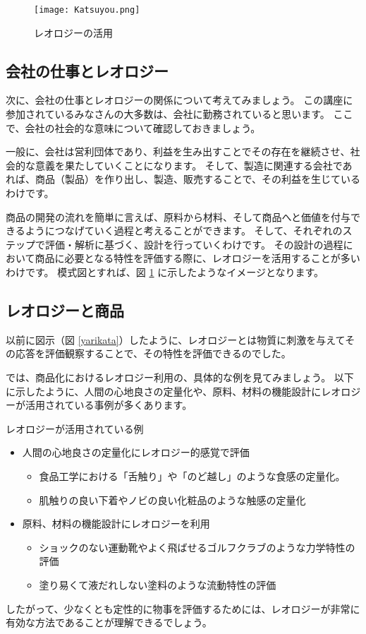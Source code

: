 \documentclass[uplatex,dvipdfmx,a4paper,11pt]{jsarticle}
\begin{document}
\begin{figure}[htb]
	\begin{center}
		\texttt{[image: Katsuyou.png]}
		\caption{レオロジーの活用}
		\label{katsuyou}
	\end{center}
\end{figure}

\subsection{会社の仕事とレオロジー}

次に、会社の仕事とレオロジーの関係について考えてみましょう。
この講座に参加されているみなさんの大多数は、会社に勤務されていると思います。
ここで、会社の社会的な意味について確認しておきましょう。

一般に、会社は営利団体であり、利益を生み出すことでその存在を継続させ、社会的な意義を果たしていくことになります。
そして、製造に関連する会社であれば、商品（製品）を作り出し、製造、販売することで、その利益を生じているわけです。

商品の開発の流れを簡単に言えば、原料から材料、そして商品へと価値を付与できるようにつなげていく過程と考えることができます。
そして、それぞれのステップで評価・解析に基づく、設計を行っていくわけです。
その設計の過程において商品に必要となる特性を評価する際に、レオロジーを活用することが多いわけです。
模式図とすれば、図 \ref{katsuyou} に示したようなイメージとなります。

\subsection{レオロジーと商品}

以前に図示（図 \ref{yarikata}）したように、レオロジーとは物質に刺激を与えてその応答を評価観察することで、その特性を評価できるのでした。

では、商品化におけるレオロジー利用の、具体的な例を見てみましょう。
以下に示したように、人間の心地良さの定量化や、原料、材料の機能設計にレオロジーが活用されている事例が多くあります。
\large
	\begin{itembox}[l]{レオロジーが活用されている例}
		\begin{itemize}
			\item
			人間の心地良さの定量化にレオロジー的感覚で評価
			\begin{itemize}
				\item 食品工学における「舌触り」や「のど越し」のような食感の定量化。
				\item 肌触りの良い下着やノビの良い化粧品のような触感の定量化
			\end{itemize}
			\item
			原料、材料の機能設計にレオロジーを利用
			\begin{itemize}
			\item
				ショックのない運動靴やよく飛ばせるゴルフクラブのような力学特性の評価
			\item
				塗り易くて液だれしない塗料のような流動特性の評価
			\end{itemize}
		\end{itemize}
	\end{itembox}
\normalsize
したがって、少なくとも定性的に物事を評価するためには、レオロジーが非常に有効な方法であることが理解できるでしょう。
\end{document}
